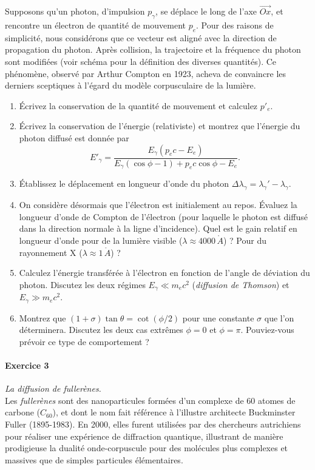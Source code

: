 Supposons qu'un photon, d'impulsion $p_\gamma$, se déplace le long de l'axe $\vec{Ox}$, et rencontre un électron de quantité de mouvement $p_e$. Pour des raisons de simplicité, nous considérons que ce vecteur est aligné avec la direction de propagation du photon. Après collision, la trajectoire et la fréquence du photon sont modifiées (voir schéma pour la définition des diverses quantités). Ce phénomène, observé par Arthur Compton en 1923, acheva de convaincre les derniers sceptiques à l'égard du modèle corpusculaire de la lumière.
\begin{enumerate}
\item Écrivez la conservation de la quantité de mouvement et calculez $p'_e$.
\item Écrivez la conservation de l'énergie (relativiste) et montrez que l'énergie du photon diffusé est donnée par
\begin{equation}
E'_\gamma = \frac{E_\gamma (p_e c - E_e)}{E_\gamma (\cos\phi-1) + p_e c \cos\phi - E_e}.
\end{equation}
\item Établissez le déplacement en longueur d'onde du photon $\Delta\lambda_\gamma = \lambda_\gamma'-\lambda_\gamma$. 
\item On considère désormais que l'électron est initialement au repos. Évaluez la longueur d'onde de Compton de l'électron (pour laquelle le photon est diffusé dans la direction normale à la ligne d'incidence). Quel est le gain relatif en longueur d'onde pour de la lumière visible ($\lambda \approx 4000 \, \mathring{A}$) ? Pour du rayonnement X ($\lambda \approx 1 \, \mathring{A}$) ?
\item Calculez l'énergie transférée à l'électron en fonction de l'angle de déviation du photon. Discutez les deux régimes $E_\gamma \ll m_e c^2$ (\textit{diffusion de Thomson}) et $E_\gamma \gg m_e c^2$.
\item Montrez que $(1 + \sigma) \tan \theta = \cot (\phi/2)$ pour une constante $\sigma$ que l'on déterminera. Discutez les deux cas extrêmes $\phi=0$ et $\phi=\pi$. Pouviez-vous prévoir ce type de comportement ?
\end{enumerate}

\paragraph{Exercice 3} \textit{La diffusion de fullerènes.} \\
Les \textit{fullerènes} sont des nanoparticules formées d'un complexe de 60 atomes de carbone ($C_{60}$), et dont le nom fait référence à l'illustre architecte Buckminster Fuller (1895-1983). En 2000, elles furent utilisées par des chercheurs autrichiens pour réaliser une expérience de diffraction quantique, illustrant de manière prodigieuse la dualité onde-corpuscule pour des molécules plus complexes et massives que de simples particules élémentaires. 


